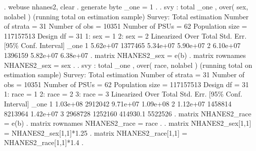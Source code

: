 . webuse nhanes2, clear
{\smallskip}
. generate byte _one = 1
{\smallskip}
.
. svy : total _one , over( sex, nolabel )
(running total on estimation sample)
{\smallskip}
Survey: Total estimation
{\smallskip}
Number of strata =      31       Number of obs    =      10351
Number of PSUs   =      62       Population size  =  117157513
                                 Design df        =         31
{\smallskip}
            1: sex = 1
            2: sex = 2
{\smallskip}
             {\VBAR}             Linearized
        Over {\VBAR}      Total   Std. Err.     [95\% Conf. Interval]
_one         {\VBAR}
           1 {\VBAR}   5.62e+07    1377465      5.34e+07    5.90e+07
           2 {\VBAR}   6.10e+07    1396159      5.82e+07    6.38e+07
{\smallskip}
. matrix NHANES2_sex = e(b)
{\smallskip}
. matrix rownames NHANES2_sex = sex
{\smallskip}
.
\cnp
. svy : total _one , over( race, nolabel )
(running total on estimation sample)
{\smallskip}
Survey: Total estimation
{\smallskip}
Number of strata =      31       Number of obs    =      10351
Number of PSUs   =      62       Population size  =  117157513
                                 Design df        =         31
{\smallskip}
            1: race = 1
            2: race = 2
            3: race = 3
{\smallskip}
             {\VBAR}             Linearized
        Over {\VBAR}      Total   Std. Err.     [95\% Conf. Interval]
_one         {\VBAR}
           1 {\VBAR}   1.03e+08    2912042      9.71e+07    1.09e+08
           2 {\VBAR}   1.12e+07    1458814       8213964    1.42e+07
           3 {\VBAR}    2968728    1252160      414930.1     5522526
{\smallskip}
. matrix NHANES2_race = e(b)
{\smallskip}
. matrix rownames NHANES2_race = race
{\smallskip}
.
. matrix NHANES2_sex[1,1] = NHANES2_sex[1,1]*1.25
{\smallskip}
. matrix NHANES2_race[1,1] = NHANES2_race[1,1]*1.4
{\smallskip}
.
